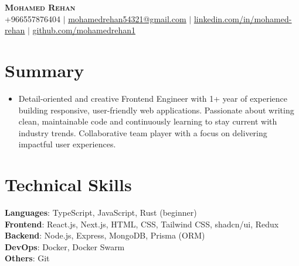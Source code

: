 \documentclass[letterpaper,11pt]{article}
\newcommand{\resumeSubHeadingListStart}{\begin{itemize}[leftmargin=0.15in, label={}]}
\newcommand{\resumeSubHeadingListEnd}{\end{itemize}}
\begin{document}

\begin{center}
    \textbf{\Huge \scshape Mohamed Rehan} \\ \vspace{2pt}
    \small  +966557876404 $|$ \href{mailto:mohamedrehan54321@gmail.com}{\underline{mohamedrehan54321@gmail.com}} $|$ 
    \href{https://www.linkedin.com/in/mohamed-rehan/}{\underline{linkedin.com/in/mohamed-rehan}} $|$
    \href{https://www.github.com/mohamedrehan1}{\underline{github.com/mohamedrehan1}}
\end{center}


\section{Summary}
\resumeSubHeadingListStart
  \item
    \small{Detail-oriented and creative Frontend Engineer with 1+ year of experience building responsive, user-friendly web applications. Passionate about writing clean, maintainable code and continuously learning to stay current with industry trends. Collaborative team player with a focus on delivering impactful user experiences.}
\resumeSubHeadingListEnd



\section{Technical Skills}
 \begin{itemize}[leftmargin=0.15in, label={}]
    \small{\item{
     \textbf{Languages}{:  TypeScript, JavaScript, Rust (beginner)} \\
     \textbf{Frontend}{: React.js, Next.js, HTML, CSS, Tailwind CSS, shadcn/ui, Redux} \\
    \textbf{Backend}{: Node.js, Express, MongoDB, Prisma (ORM)} \\
     \textbf{DevOps}{: Docker, Docker Swarm} \\
     \textbf{Others}{: Git}
    }}
 \end{itemize}
\end{document}
